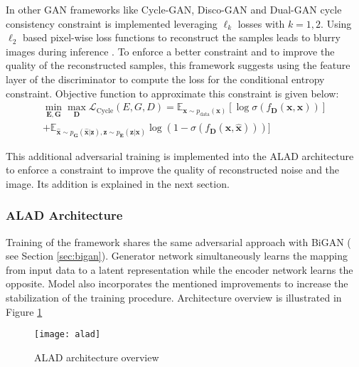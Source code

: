 In other GAN frameworks like Cycle-GAN\cite{Zhu2017UnpairedIT}, Disco-GAN \cite{Kim2017LearningTD}
and Dual-GAN \cite{Yi2017DualGANUD} cycle consistency constraint is implemented leveraging
$\ell_{k}$ losses with $k=1,2$. Using $\ell_2$ based pixel-wise loss functions to reconstruct the samples
leads to blurry images during inference \cite{Larsen2016AutoencodingBP}\cite{Li2017TowardsUA}.
To enforce a better constraint and to improve the quality of the reconstructed samples, this
framework suggests using the feature layer of the discriminator to compute the loss for the
conditional entropy constraint. Objective function to approximate this constraint is given
below:
\begin{multline}
    \label{eqn:alice}
     \min _{\boldsymbol{E}, \boldsymbol{G}} \max _{\boldsymbol{D}}
\mathcal{L}_{\mathrm{Cycle}}(E,G,D)
=\mathbb{E}_{\boldsymbol{x} \sim p_{\text{data}}(\boldsymbol{x})}\left[\log
\sigma\left(f_{\boldsymbol{D}}(\boldsymbol{x}, \boldsymbol{x})\right)\right] \\
+\mathbb{E}_{\hat{\boldsymbol{x}} \sim p_{\boldsymbol{G}}(\hat{\boldsymbol{x}} | \boldsymbol{z}),
\boldsymbol{z} \sim p_{\boldsymbol{E}}(\boldsymbol{z} | \boldsymbol{x})} \log
\left(1-\sigma\left(f_{\boldsymbol{D}}(\boldsymbol{x}, \hat{\boldsymbol{x}})\right)\right) ] 
\end{multline}

This additional adversarial training is implemented into the ALAD architecture to enforce a
constraint to improve the quality of reconstructed noise and the image. Its addition is explained in
the next section.

\subsubsection{ALAD Architecture}
\label{sec:alad_arc}

Training of the framework shares the same adversarial approach with BiGAN
( see Section \ref{sec:bigan}). Generator network simultaneously learns the mapping from input data to a latent
representation while the encoder network learns the opposite. Model also incorporates the mentioned
improvements to increase the stabilization of the training procedure. Architecture overview is
illustrated in Figure \ref{fig:alad_model}

\begin{figure}[h!]
	\centering
	\texttt{[image: alad]}
    \caption{ALAD architecture overview}
    \label{fig:alad_model}
\end{figure}

